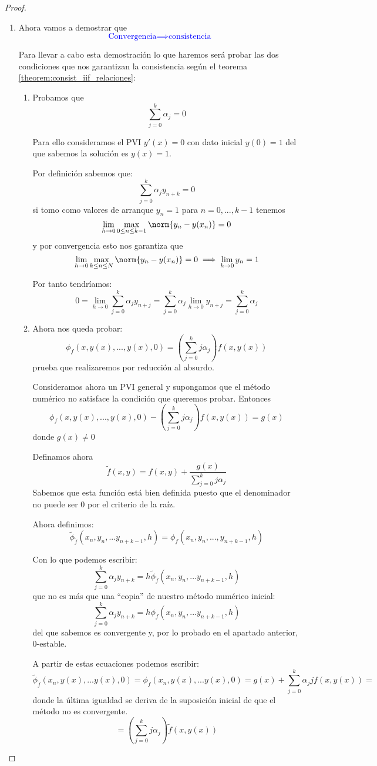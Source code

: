 \documentclass{apuntes}
\begin{document}
\begin{proof}
\begin{itemize}
\begin{enumerate}
\item Ahora vamos a demostrar que
\textcolor{blue}{\[\text{Convergencia} \implies \text{consistencia}\]}

Para llevar a cabo esta demostración lo que haremos será probar las dos condiciones que nos garantizan la consistencia según el teorema \ref{theorem:consist_iif_relaciones}:
\begin{enumerate}
\item Probamos que
\[\sum_{j=0}^kα_j = 0\]

Para ello consideramos el PVI $y'(x)=0$ con dato inicial $y(0)=1$ del que sabemos la solución es $y(x)=1$.

Por definición sabemos que:
\[\sum_{j=0}^kα_jy_{n+k}=0\]
si tomo como valores de arranque $y_n=1$ para $n=0,...,k-1$ tenemos
\[\lim_{h \to 0} \max_{0 \leq n \leq k-1} \norm{y_n-y(x_n)} = 0\]
y por convergencia esto nos garantiza que 
\[\lim_{h \to 0} \max_{k \leq n \leq N} \norm{y_n-y(x_n)} = 0 \implies \lim_{h\to 0}y_n = 1\]

Por tanto tendríamos:
\[0 = \lim_{h \to 0} \sum_{j=0}^kα_jy_{n+j} = \sum_{j=0}^k α_j\lim_{h\to 0} y_{n+j} = \sum_{j=0}^kα_j\]

\item Ahora nos queda probar:
\[\phi_f(x,y(x),...,y(x),0)=\left( \sum_{j=0}^kjα_j\right)f(x,y(x))\]
prueba que realizaremos por reducción al absurdo.

Consideramos ahora un PVI general y supongamos que el método numérico no satisface la condición que queremos probar. Entonces
\[\phi_f(x,y(x),...,y(x),0)-\left( \sum_{j=0}^kjα_j\right)f(x,y(x)) = g(x)\]
donde $g(x)\neq 0$

Definamos ahora 
\[\tilde{f}(x,y) = f(x,y)+\frac{g(x)}{\sum_{j=0}^kjα_j}\]
\obs Sabemos que esta función está bien definida puesto que el denominador no puede ser 0 por el criterio de la raíz.

Ahora definimos:
\[\tilde{\phi}_{\tilde{f}}(x_n,y_n,...y_{n+k-1},h)=\phi_f(x_n,y_n,...,y_{n+k-1},h)\]

Con lo que podemos escribir:
\[\sum_{j=0}^kα_jy_{n+k} = h \tilde{\phi}_{\tilde{f}}(x_n,y_n,...y_{n+k-1},h)\]
que no es más que una ``copia'' de nuestro método numérico inicial:
\[\sum_{j=0}^kα_jy_{n+k} = h \phi_{f}(x_n,y_n,...y_{n+k-1},h)\]
del que sabemos es convergente y, por lo probado en el apartado anterior, 0-estable.

A partir de estas ecuaciones podemos escribir:
\[\tilde{\phi}_{\tilde{f}}(x_n,y(x),...y(x),0) =  \phi_{f}(x_n,y(x),...y(x),0) = g(x)+\sum_{j=0}^kα_{j}jf(x,y(x))=\]
donde la última igualdad se deriva de la suposición inicial de que el método no es convergente.
\[=\left( \sum_{j=0}^kjα_j\right)\tilde{f}(x,y(x))\]


\end{enumerate}
\end{enumerate}
\end{itemize}
\end{proof}
\end{document}
